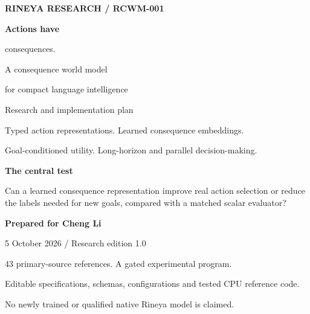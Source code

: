 \begin{titlepage}
\thispagestyle{empty}
\vspace*{0.45cm}
{\sffamily\bfseries\color{Accent}\large RINEYA RESEARCH / RCWM-001\par}
\vspace{1.25cm}
{\sffamily\bfseries\color{Ink}\fontsize{37}{43}\selectfont Actions have\par consequences.\par}
\vspace{0.6cm}
{\sffamily\color{Ink}\fontsize{21}{28}\selectfont A consequence world model\par for compact language intelligence\par}
\vspace{0.9cm}
{\large Research and implementation plan\par}
\vspace{0.25cm}
{\color{Muted}Typed action representations. Learned consequence embeddings.\par Goal-conditioned utility. Long-horizon and parallel decision-making.\par}
\vspace{0.9cm}
\noindent\colorbox{Pale}{\parbox{0.92\textwidth}{\vspace{0.25cm}\hspace{0.15cm}\begin{minipage}{0.86\textwidth}\sffamily\color{Ink}\textbf{The central test}\par
Can a learned consequence representation improve real action selection or reduce the labels needed for new goals, compared with a matched scalar evaluator?
\end{minipage}\vspace{0.25cm}}}
\vfill
{\sffamily\bfseries\color{Ink}Prepared for Cheng Li\par}
\vspace{0.2cm}
{\sffamily\color{Muted}5 October 2026 / Research edition 1.0\par}
\vspace{0.5cm}
{\small\color{Muted}43 primary-source references. A gated experimental program.\par Editable specifications, schemas, configurations and tested CPU reference code.\par No newly trained or qualified native Rineya model is claimed.\par}
\end{titlepage}
\setcounter{page}{1}
